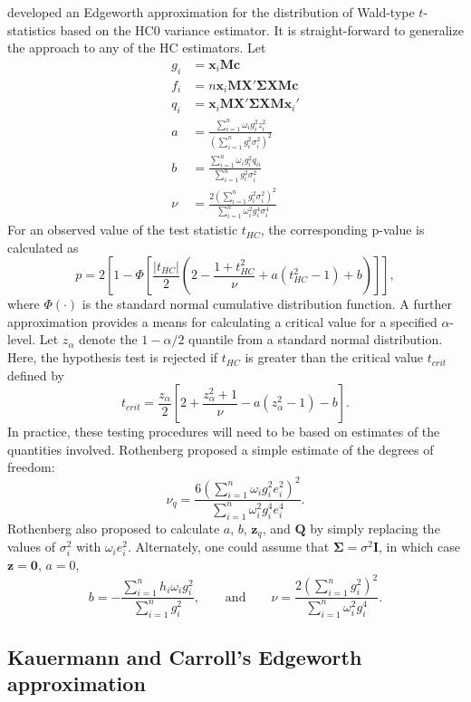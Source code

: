 \documentclass[12pt]{article}\usepackage[]{graphicx}\usepackage[]{color}
\newcommand{\bm}{\mathbf}
\newcommand{\bs}{\boldsymbol}
\begin{document}
\citet{Rothenberg1988approximate} developed an Edgeworth approximation for the distribution of Wald-type $t$-statistics based on the HC0 variance estimator.
It is straight-forward to generalize the approach to any of the HC estimators.
Let
\begin{align*}
g_i &= \bm{x}_i\bm{M}\bm{c} \\
f_i &= n \bm{x}_i \bm{M} \bm{X}' \bs\Sigma \bm{X}\bm{M}\bm{c} \\ 
q_i &= \bm{x}_i\bm{M}\bm{X}'\bs\Sigma \bm{X}\bm{M}\bm{x}_i' \\
a &= \frac{\sum_{i=1}^n \omega_i g_i^2 z_i^2}{\left(\sum_{i=1}^n g_i^2 \sigma_i^2\right)^2} \\
b &= \frac{\sum_{i=1}^n \omega_i g_i^2  q_{ii}}{\sum_{i=1}^n g_i^2 \sigma_i^2} \\
\nu &= \frac{2\left(\sum_{i=1}^n g_i^2 \sigma_i^2\right)^2}{\sum_{i=1}^n \omega_i^2 g_i^4 \sigma_i^4}
\end{align*}
For an observed value of the test statistic $t_{HC}$, the corresponding p-value is calculated as \[
p = 2 \left[1 - \Phi\left[\frac{\left|t_{HC}\right|}{2}\left(2 - \frac{1 + t_{HC}^2}{\nu} + a\left(t_{HC}^2 - 1\right) + b\right)\right]\right], \]
where $\Phi(\cdot)$ is the standard normal cumulative distribution function. 
A further approximation provides a means for calculating a critical value for a specified $\alpha$-level. Let $z_{\alpha}$ denote the $1 - \alpha / 2$ quantile from a standard normal distribution. Here, the hypothesis test is rejected if $t_{HC}$ is greater than the critical value $t_{crit}$ defined by \[
t_{crit} = \frac{z_{\alpha}}{2}\left[2 + \frac{z_{\alpha}^2 + 1}{\nu} - a\left(z_{\alpha}^2 - 1\right) - b\right]. \]
In practice, these testing procedures will need to be based on estimates of the quantities involved. Rothenberg proposed a simple estimate of the degrees of freedom: \[
\nu_q = \frac{6\left(\sum_{i=1}^n \omega_i g_i^2 e_i^2\right)^2}{\sum_{i=1}^n \omega_i^2 g_i^4 e_i^4}.
\]
Rothenberg also proposed to calculate $a$, $b$, $\bm{z}_q$, and $\bm{Q}$ by simply replacing the values of $\sigma_i^2$ with $\omega_i e_i^2$. Alternately, one could assume that $\bs\Sigma = \sigma^2 \bm{I}$, in which case $\bm{z} = \bm{0}$, $a = 0$, 
\[
b = - \frac{\sum_{i=1}^n h_i \omega_i g_i^2}{\sum_{i=1}^n g_i^2}, \qquad \text{and} \qquad 
\nu = \frac{2\left(\sum_{i=1}^n g_i^2 \right)^2}{\sum_{i=1}^n \omega_i^2 g_i^4}. 
\]

\subsection{Kauermann and Carroll's Edgeworth approximation}
\end{document}
